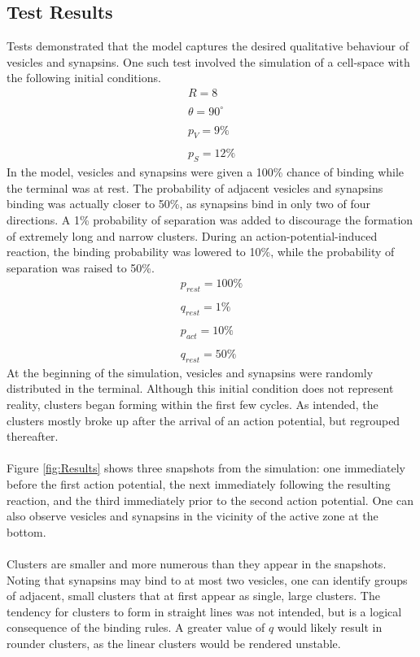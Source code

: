 \documentclass{acm_proc_article-sp}
\begin{document}
\subsection{Test Results}
Tests demonstrated that the model captures the desired
qualitative behaviour of vesicles and synapsins.  One 
such test involved the simulation of a cell-space with 
the following initial conditions.
\begin{displaymath} \begin{array}{l}
R = 8 \\
\\
\theta = 90^\circ \\
\\
p_V = 9\% \\
\\
p_S = 12\% 
\end{array} \end{displaymath}
In the model, vesicles and synapsins were given a
100\% chance of binding while the terminal was at
rest.  The probability of adjacent vesicles and 
synapsins binding was actually closer to 50\%, as
synapsins bind in only two of four directions.  A
1\% probability of separation was added to discourage 
the formation of extremely long and narrow clusters.
During an action-potential-induced reaction, the binding
probability was lowered to 10\%, while the probability 
of separation was raised to 50\%.
\begin{displaymath} \begin{array}{l}
p_{rest} = 100\% \\
\\
q_{rest} = 1\% \\
\\
p_{act} = 10\% \\
\\
q_{rest} = 50\%
\end{array} \end{displaymath}
At the beginning of the simulation, vesicles and 
synapsins were randomly distributed in the 
terminal.  Although this initial condition does
not represent reality, clusters began forming 
within the first few cycles.  As intended, the clusters mostly
broke up after the arrival of an action 
potential, but regrouped thereafter.\\
\\
Figure \ref{fig:Results} shows three 
snapshots from the simulation: one immediately
before the first action potential, the next 
immediately following the resulting reaction, and the
third immediately prior to the second action 
potential.  One can also observe vesicles and
synapsins in the vicinity of the active zone at
the bottom.  \\
\\
Clusters are smaller and more numerous
than they appear in the snapshots.  Noting that
synapsins may bind to at most two vesicles, one
can identify groups of adjacent, small clusters that
at first appear as single, large clusters.  The
tendency for clusters to form in straight lines was
not intended, but is a logical consequence of the
binding rules.  A greater value of $q$ would likely
result in rounder clusters, as the linear clusters
would be rendered unstable.
\end{document}
